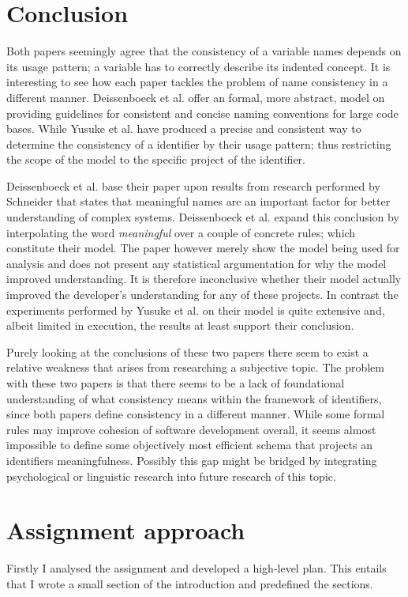 \documentclass[a4paper,12pt]{article}
\begin{document}
\begin{multicols}{2}
\section*{Conclusion}
Both papers seemingly agree that the consistency of a variable names depends on its usage pattern; a variable has to correctly describe its indented concept. It is interesting to see how each paper tackles the problem of name consistency in a different manner. Deissenboeck et al. offer an formal, more abstract, model on providing guidelines for consistent and concise naming conventions for large code bases. While Yusuke et al. have produced a precise and consistent way to determine the consistency of a identifier by their usage pattern; thus restricting the scope of the model to the specific project of the identifier.

Deissenboeck et al. base their paper upon results from research performed by Schneider that states that meaningful names are an important factor for better understanding of complex systems. Deissenboeck et al. expand this conclusion by interpolating the word \textit{meaningful} over a couple of concrete rules; which constitute their model. The paper however merely show the model being used for analysis and does not present any statistical argumentation for why the model improved understanding. It is therefore inconclusive whether their model actually improved the developer's understanding for any of these projects. In contrast the experiments performed by Yusuke et al. on their model is quite extensive and, albeit limited in execution, the results at least support their conclusion. 

Purely looking at the conclusions of these two papers there seem to exist a relative weakness that arises from researching a subjective topic. The problem with these two papers is that there seems to be a lack of foundational understanding of what consistency means within the framework of identifiers, since both papers define consistency in a different manner. While some formal rules may improve cohesion of software development overall, it seems almost impossible to define some objectively most efficient schema that projects an identifiers meaningfulness. Possibly this gap might be bridged by integrating psychological or linguistic research into future research of this topic.


\section*{Assignment approach}
Firstly I analysed the assignment and developed a high-level plan. This entails that I wrote a small section of the introduction and predefined the sections. 


\end{multicols}
\end{document}
